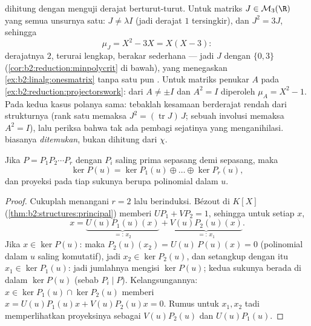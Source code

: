 \begin{example}\label{ex:b2:reduction:minpolyhand}
 dihitung dengan menguji derajat berturut-turut.
Untuk matriks $J \in \mathcal{M}_3(\R)$ yang semua unsurnya satu:
$J \neq \lambda I$ (jadi derajat $1$ tersingkir), dan $J^2 = 3J$, sehingga
\[
\mu_J = X^2 - 3X = X(X - 3) :
\]
derajatnya $2$, terurai lengkap, berakar sederhana --- jadi $J$  dengan  $\{0, 3\}$
(\cref{cor:b2:reduction:minpolycrit} di bawah), yang menegaskan
\cref{ex:b2:linalg:onesmatrix} tanpa satu pun . Untuk matriks
penukar $A$ pada \cref{ex:b2:reduction:projectorswork}: dari $A \neq \pm I$
dan $A^2 = I$ diperoleh $\mu_A = X^2 - 1$. Pada kedua kasus polanya
sama: tebaklah kesamaan berderajat rendah dari strukturnya
(rank satu memaksa $J^2 = (\operatorname{tr}J)\,J$; sebuah involusi
memaksa $A^2 = I$), lalu periksa bahwa tak ada pembagi sejatinya yang
menganihilasi.  biasanya \emph{ditemukan}, bukan
dihitung dari $\chi$.
\end{example}

\begin{theorem}\label{thm:b2:reduction:kernels}
Jika $P = P_1 P_2 \cdots P_r$ dengan $P_i$ saling prima sepasang demi
sepasang, maka
\[
\ker P(u) = \ker P_1(u) \oplus \dots \oplus \ker P_r(u),
\]
dan proyeksi pada tiap sukunya berupa polinomial dalam $u$.
\end{theorem}

\begin{proof}
Cukuplah menangani $r = 2$ lalu berinduksi. Bézout di $K[X]$
(\cref{thm:b2:structures:principal}) memberi $U P_1 + V P_2 = 1$,
sehingga untuk setiap $x$,
\[
x = \underbrace{U(u)P_1(u)(x)}_{=:\,x_2}
+ \underbrace{V(u)P_2(u)(x)}_{=:\,x_1}.
\]
Jika $x \in \ker P(u)$: maka $P_2(u)(x_2) = U(u)\,P(u)(x) = 0$
(polinomial dalam $u$ saling komutatif), jadi $x_2 \in \ker P_2(u)$, dan
setangkup dengan itu $x_1 \in \ker P_1(u)$: jadi jumlahnya mengisi
$\ker P(u)$; kedua sukunya berada di dalam $\ker P(u)$ (sebab $P_i \mid
P$). Kelangsungannya: $x \in \ker P_1(u) \cap \ker P_2(u)$ memberi $x =
U(u)P_1(u)x + V(u)P_2(u)x = 0$. Rumus untuk $x_1, x_2$ tadi
memperlihatkan proyeksinya sebagai $V(u)P_2(u)$ dan $U(u)P_1(u)$.
\end{proof}


